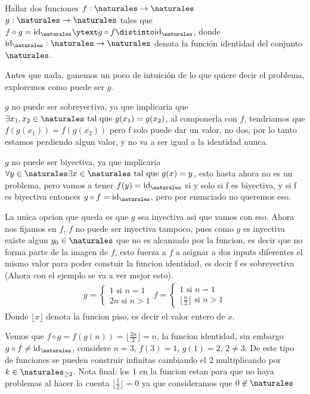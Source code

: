 \begin{enunciado}{\ejercicio}
  Hallar dos funciones $f : \naturales \to \naturales$ \ytext $g : \naturales \to \naturales$ tales que $f \circ g = \text{id}_{\naturales}
    \ytext g \circ f \distinto \text{id}_{\naturales}$, donde $\text{id}_{\naturales}: \naturales \to \naturales$ denota la función identidad del
  conjunto $\naturales$.
\end{enunciado}

Antes que nada, ganemos un poco de intuición de lo que quiere decir el problema, exploremos
como puede ser $g$. 

$g$ no puede ser sobreyectiva, ya que implicaria que $\exists x_1, x_2 \in \naturales \text{ tal que } g(x_1) = g(x_2)$,
al componerla con $f$, tendriamos que $f(g(x_1)) = f(g(x_2))$ pero f solo puede dar un valor, no dos, por lo tanto 
estamos perdiendo algun valor, y no va a ser igual a la identidad nunca. 

$g$ no puede ser biyectiva, ya que implicaria $\forall y \in \naturales \exists x \in \naturales \text{ tal que } g(x) = y$, esto 
hasta ahora no es un problema, pero vamos a tener $f(y) = \text{id}_{\naturales}$ si y solo si f es biyectiva, y si f es biyectiva entonces 
$g \circ f = \text{id}_{\naturales}$, pero por enunciado no queremos eso. 

La unica opcion que queda es que $g$ sea inyectiva asi que vamos con eso. Ahora nos fijamos
en $f$, $f$ no puede ser inyectiva tampoco, pues como $g$ es inyectiva existe algun $y_0 \in \naturales$ que no 
es alcanzado por la funcion, es decir que no forma parte de la imagen de $f$, esto fuerza a $f$ a asignar a dos inputs diferentes
el mismo valor para poder constuir la funcion identidad, es decir f es sobreyectiva (Ahora con el ejemplo se va a ver mejor esto). 
$$
\begin{array}{c}
 g = \begin{cases}
 1 \text{ si } n = 1 \\
 2n \text{ si } n > 1
 \end{cases}
 f = \begin{cases}
 1 \text{ si } n = 1 \\
 \lfloor \frac{n}{2} \rfloor \text{ si } n > 1
 \end{cases}
\end{array}
$$
Donde $\lfloor x \rfloor$ denota la funcion piso, es decir el valor entero de $x$. 

Vemos que $f \circ g = f(g(n)) = \lfloor \frac{2n}{2} \rfloor = n$, la funcion identidad, sin embargo
$g \circ f \neq \text{id}_{\naturales}$, considere $n = 3$, $f(3) = 1$, $g(1) = 2$, $2 \neq 3$. De este tipo
de funciones se pueden construir infinitas cambiando el $2$ multiplicando por $k \in {\naturales}_{\geq 2}$. 
Nota final: los $1$ en la funcion estan para que no haya problemas al hacer la cuenta $\lfloor \frac{1}{2} \rfloor = 0$ ya que consideramos que $0 \not\in \naturales$

\begin{aportes}
 \item {}
\end{aportes}